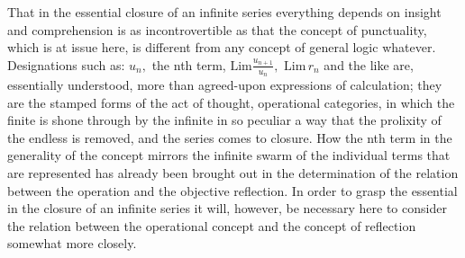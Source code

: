 \documentclass[12pt,a4paper,openany]{book}
\begin{document}
That in the essential closure of an infinite series everything depends on insight and comprehension is as incontrovertible as that the concept of punctuality, which is at issue here, is different from any concept of general logic whatever. Designations such as: $u_{n},$ the nth term, $\mathrm{Lim}\frac{u_{n+1}}{u_{n}},$
$\mathrm{Lim}\,r_{n}$ and the like are, essentially understood, more than agreed-upon expressions of calculation; they are the stamped forms of the act of thought, operational categories, in which the finite is shone through by the infinite in so peculiar a way that the prolixity of the endless is removed, and the series comes to closure. How the nth term in the generality of the concept mirrors the infinite swarm of the individual terms that are represented has already been brought out in the determination of the relation between the operation and the objective reflection. In order to grasp the essential in the closure of an infinite series it will, however, be necessary here to consider the relation between the operational concept and the concept of reflection somewhat more closely.
\end{document}

